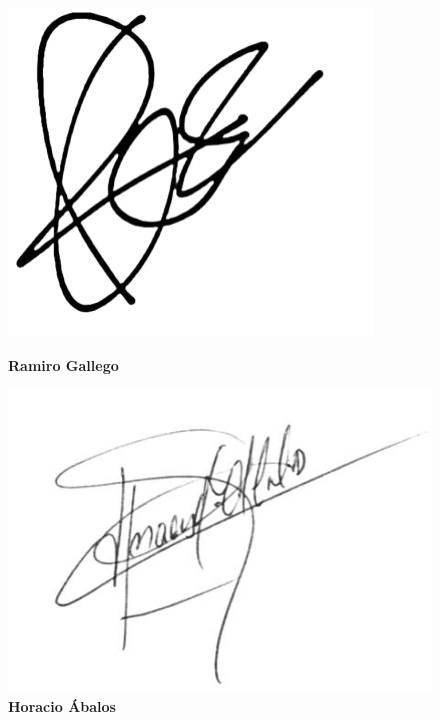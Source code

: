 \begin{figure}[H]
\begin{minipage}[t]{0.22\textwidth}
        \includegraphics[width=\textwidth]{../imagenes/firmas/RG.jpg}
        \caption*{\textbf{Ramiro Gallego}\\\fechafirma}
    \end{minipage}
    \hfill
    \begin{minipage}[t]{0.22\textwidth}
        \centering
        \includegraphics[width=\textwidth]{../imagenes/firmas/HA.jpg}
        \caption*{\textbf{Horacio Ábalos}\\\fechafirma}
    \end{minipage}
\end{figure}



